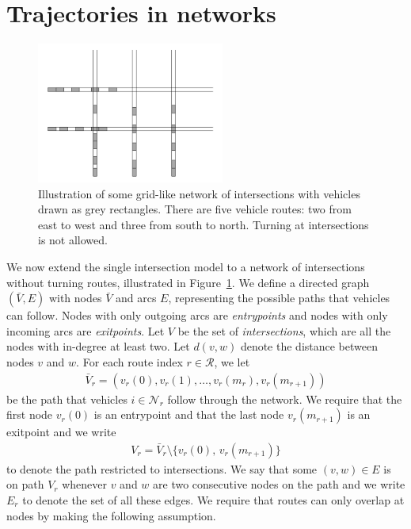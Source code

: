 \documentclass[a4paper]{article}
\theoremstyle{definition}
\theoremstyle{plain}
\begin{document}

\newpage

\section{Trajectories in networks}

\begin{figure}
  \centering
  \includegraphics[width=0.55\textwidth]{figures/network/grid_example.png}
  \caption{Illustration of some grid-like network of intersections with vehicles
    drawn as grey rectangles. There are five vehicle routes: two from east to
    west and three from south to north. Turning at intersections is not
    allowed.}\label{fig:network_illustration}
\end{figure}

We now extend the single intersection model to a network of intersections
without turning routes, illustrated in Figure~\ref{fig:network_illustration}.
We define a directed graph $(\bar{V},E)$ with nodes $\bar{V}$ and arcs $E$,
representing the possible paths that vehicles can follow. Nodes with only
outgoing arcs are \textit{entrypoints} and nodes with only incoming arcs are \textit{exitpoints}.
Let $V$ be the set of \textit{intersections}, which are all the nodes with
in-degree at least two.
%
Let $d(v, w)$ denote the distance between nodes $v$ and $w$.
%
For each route index $r \in \mathcal{R}$, we let
\begin{align*}
  \bar{V}_{r} = (v_{r}(0), v_{r}(1), \dots, v_{r}(m_{r}), v_{r}(m_{r+1}))
\end{align*}
be the path that vehicles $i \in \mathcal{N}_{r}$ follow through the network. We
require that the first node $v_{r}(0)$ is an entrypoint and that the last node
$v_{r}(m_{r+1})$ is an exitpoint and we write
\begin{align*}
  V_{r} = \bar{V}_{r} \setminus \{ v_{r}(0), \, v_{r}(m_{r+1}) \}
\end{align*}
to denote the path restricted to intersections. We say that some $(v, w) \in E$
is on path $V_{r}$ whenever $v$ and $w$ are two consecutive nodes on the path
and we write $E_{r}$ to denote the set of all these edges. We require that
routes can only overlap at nodes by making the following assumption.
\end{document}
